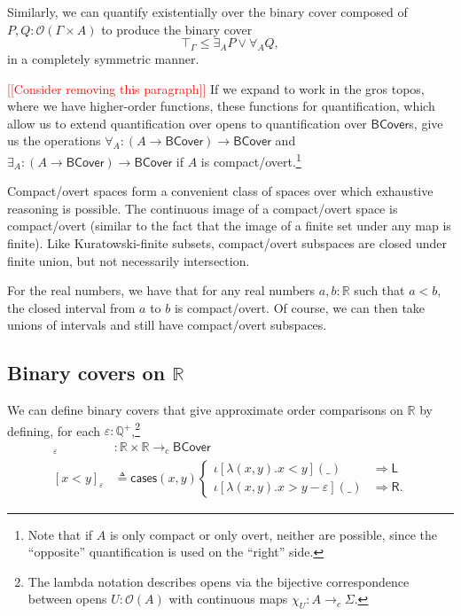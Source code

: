 \documentclass[conference]{IEEEtran}
\newcommand{\cto}{\to_c}
\newcommand{\R}{\mathbb{R}}
\newcommand{\rat}{\mathbb{Q}}
\newcommand{\Open}[1]{\mathcal{O}({#1})}
\newcommand{\wildcard}{\_}
\newcommand{\oinclf}[1]{\iota[{#1}]}
\newcommand{\oincl}[2]{\oinclf{#1} \left({#2}\right)}
\newcommand{\Branch}{\Rightarrow}
\newcommand{\note}[1]{\textcolor{red}{[[{#1}]]}}
\begin{document}
Similarly, we can quantify existentially over the binary cover composed of $P, Q : \Open{\Gamma \times A}$ to produce the binary cover
\[
\top_\Gamma \le \exists_A P \vee \forall_A Q,
\]
in a completely symmetric manner.

\note{Consider removing this paragraph} If we expand to work in the gros topos, where we have higher-order functions, these functions for quantification, which allow us to extend quantification over opens to quantification over $\mathsf{BCover}$s, give us the operations $\forall_A : (A \to \mathsf{BCover}) \to \mathsf{BCover}$ and $\exists_A : (A \to \mathsf{BCover}) \to \mathsf{BCover}$ if $A$ is compact/overt.\footnote{Note that if $A$ is only compact or only overt, neither are possible, since the ``opposite'' quantification is used on the ``right'' side.}

Compact/overt spaces form a convenient class of spaces over which exhaustive reasoning is possible. The continuous image of a compact/overt space is compact/overt (similar to the fact that the image of a finite set under any map is finite). Like Kuratowski-finite subsets, compact/overt subspaces are closed under finite union, but not necessarily intersection.

For the real numbers, we have that for any real numbers $a, b : \R$ such that $a < b$, the closed interval from $a$ to $b$ is compact/overt. Of course, we can then take unions of intervals and still have compact/overt subspaces.

\subsection{Binary covers on $\R$}

We can define binary covers that give approximate order comparisons on $\R$ by defining, for each $\varepsilon : \rat^+$,\footnote{The lambda notation describes opens via the bijective correspondence between opens $U : \Open{A}$ with continuous maps $\chi_U : A \cto \Sigma$.}
\begin{align*}
[ \cdot < \cdot ]_\varepsilon &: \R \times \R \cto \mathsf{BCover}
\\ [x < y]_\varepsilon &\triangleq \mathsf{cases}(x, y)
\begin{cases}
\oincl{\lambda (x, y). x < y}{\wildcard} &\Branch \mathsf{L}
\\ \oincl{\lambda (x, y). x > y - \varepsilon}{\wildcard} &\Branch \mathsf{R}.
\end{cases}
\end{align*}
\end{document}
